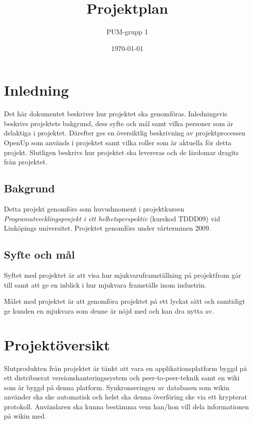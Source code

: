 

\ifpdf
\else
\fi

\title{Projektplan}
\author{PUM-grupp 1}
\date{\today}



\maketitle\thispagestyle{empty}

\newpage

\section{Inledning}
Det här dokumentet beskriver hur projektet ska genomföras. Inledningsvis beskrivs projektets bakgrund, dess syfte och mål samt vilka personer som är delaktiga i projektet. Därefter ges en översiktlig beskrivning av projektprocessen OpenUp som används i projektet samt vilka roller som är aktuella för detta projekt. Slutligen beskrivs hur projektet ska levereras och de lärdomar dragits från projektet.

\subsection{Bakgrund}
Detta projekt genomförs som huvudmoment i projektkursen \textit{Programutvecklingsprojekt i ett helhetsperspektiv} (kurskod TDDD09) vid Linköpings universitet. Projektet genomförs under vårterminen 2009.

\subsection{Syfte och mål}
Syftet med projektet är att visa hur mjukvaruframställning på projektfrom går till samt att ge en inblick i hur mjukvara framställs inom industrin.

Målet med projektet är att genomföra projektet på ett lyckat sätt och samtidigt ge kunden en mjukvara som denne är nöjd med och kan dra nytta av.

\section{Projektöversikt}
Slutprodukten från projektet är tänkt att vara en applikationsplatform byggd på ett distribuerat versionshanteringssystem och peer-to-peer-teknik samt en wiki som är byggd på denna platform. Synkronseringen av databasen som wikin använder ska ske automatisk och helst ska denna överföring ske via ett krypterat protokoll. Användaren ska kunna bestämma vem han/hon vill dela informationen på wikin med.

